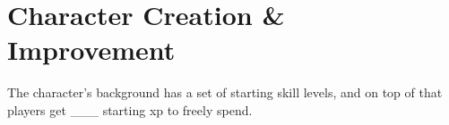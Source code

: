   
    
    

  
\section{Character Creation \& Improvement}
The character's background has a set of starting skill levels,
and on top of that players get \_\_\_ starting xp to freely spend.

